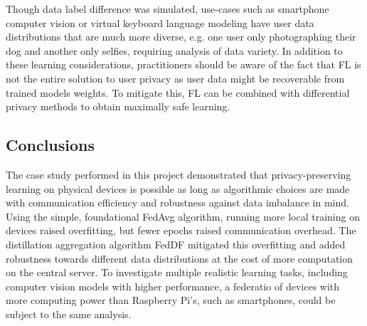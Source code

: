 \documentclass{article}
\begin{document}
Though data label difference was simulated, use-cases such as smartphone computer vision or virtual keyboard language modeling have user data distributions that are much more diverse, e.g. one user only photographing their dog and another only selfies, requiring analysis of data variety.
In addition to these learning considerations, practitioners should be aware of the fact that FL is not the entire solution to user privacy as user data might be recoverable from trained models weights.
To mitigate this, FL can be combined with differential privacy methods \cite{xiong2020ldp} to obtain maximally safe learning.

\subsection{Conclusions}
The case study performed in this project demonstrated that privacy-preserving learning on physical devices is possible as long as algorithmic choices are made with communication efficiency and robustness against data imbalance in mind.
Using the simple, foundational FedAvg algorithm, running more local training on devices raised overfitting, but fewer epochs raised communication overhead.
The distillation aggregation algorithm FedDF mitigated this overfitting and added robustness towards different data distributions at the cost of more computation on the central server.
To investigate multiple realistic learning tasks, including computer vision models with higher performance, a federatio of devices with more computing power than Raspberry Pi's, such as smartphones, could be subject to the same analysis.

\vfill
\pagebreak




\appendix
\end{document}
